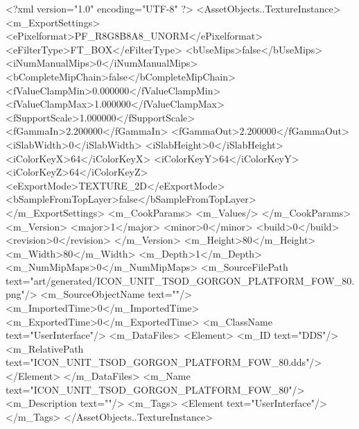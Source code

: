 <?xml version="1.0" encoding="UTF-8" ?>
<AssetObjects..TextureInstance>
	<m_ExportSettings>
		<ePixelformat>PF_R8G8B8A8_UNORM</ePixelformat>
		<eFilterType>FT_BOX</eFilterType>
		<bUseMips>false</bUseMips>
		<iNumManualMips>0</iNumManualMips>
		<bCompleteMipChain>false</bCompleteMipChain>
		<fValueClampMin>0.000000</fValueClampMin>
		<fValueClampMax>1.000000</fValueClampMax>
		<fSupportScale>1.000000</fSupportScale>
		<fGammaIn>2.200000</fGammaIn>
		<fGammaOut>2.200000</fGammaOut>
		<iSlabWidth>0</iSlabWidth>
		<iSlabHeight>0</iSlabHeight>
		<iColorKeyX>64</iColorKeyX>
		<iColorKeyY>64</iColorKeyY>
		<iColorKeyZ>64</iColorKeyZ>
		<eExportMode>TEXTURE_2D</eExportMode>
		<bSampleFromTopLayer>false</bSampleFromTopLayer>
	</m_ExportSettings>
	<m_CookParams>
		<m_Values/>
	</m_CookParams>
	<m_Version>
		<major>1</major>
		<minor>0</minor>
		<build>0</build>
		<revision>0</revision>
	</m_Version>
	<m_Height>80</m_Height>
	<m_Width>80</m_Width>
	<m_Depth>1</m_Depth>
	<m_NumMipMaps>0</m_NumMipMaps>
	<m_SourceFilePath text="art/generated/ICON_UNIT_TSOD_GORGON_PLATFORM_FOW_80.png"/>
	<m_SourceObjectName text=""/>
	<m_ImportedTime>0</m_ImportedTime>
	<m_ExportedTime>0</m_ExportedTime>
	<m_ClassName text="UserInterface"/>
	<m_DataFiles>
		<Element>
			<m_ID text="DDS"/>
			<m_RelativePath text="ICON_UNIT_TSOD_GORGON_PLATFORM_FOW_80.dds"/>
		</Element>
	</m_DataFiles>
	<m_Name text="ICON_UNIT_TSOD_GORGON_PLATFORM_FOW_80"/>
	<m_Description text=""/>
	<m_Tags>
		<Element text="UserInterface"/>
	</m_Tags>
</AssetObjects..TextureInstance>
